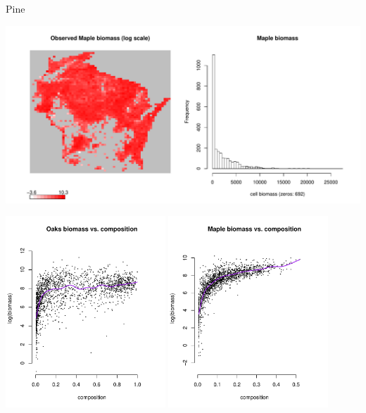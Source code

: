 \documentclass{beamer}
\begin{document}
\begin{frame}{Pine}
\begin{center}
  \includegraphics[width=\textwidth]{../../figures/raw/Maple-observed-heatmap.pdf}
\end{center}
\end{frame}

\begin{frame}{}
  \begin{center}
    \includegraphics[width=0.45\textwidth]{../../figures/raw/Oaks-biomass-v-composition.pdf}
    \includegraphics[width=0.45\textwidth]{../../figures/raw/Maple-biomass-v-composition.pdf} 
  \end{center}
\end{frame}
\end{document}
